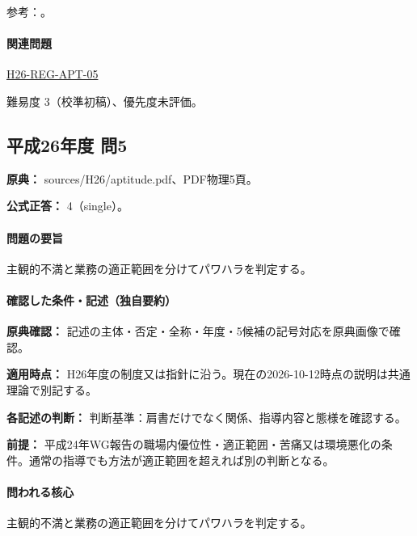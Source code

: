\par 参考：\cite{employment_power2012,employment_power_current}。

\paragraph{関連問題} \hyperref[q:h26-reg-apt-05]{H26-REG-APT-05}

\par 難易度 3（校準初稿）、優先度未評価。

\subsection{平成26年度 問5}
\label{q:h26-reg-apt-05}

\noindent\textbf{原典：} sources/H26/aptitude.pdf、PDF物理5頁。

\textbf{公式正答：} 4（single）。

\paragraph{問題の要旨} 主観的不満と業務の適正範囲を分けてパワハラを判定する。

\paragraph{確認した条件・記述（独自要約）}\mbox{}\par

\noindent\textbf{原典確認：} 記述の主体・否定・全称・年度・5候補の記号対応を原典画像で確認。\par

\noindent\textbf{適用時点：} H26年度の制度又は指針に沿う。現在の2026-10-12時点の説明は共通理論で別記する。\par

\noindent\textbf{各記述の判断：} 判断基準：肩書だけでなく関係、指導内容と態様を確認する。\par

\noindent\textbf{前提：} 平成24年WG報告の職場内優位性・適正範囲・苦痛又は環境悪化の条件。通常の指導でも方法が適正範囲を超えれば別の判断となる。\par

\paragraph{問われる核心} 主観的不満と業務の適正範囲を分けてパワハラを判定する。

